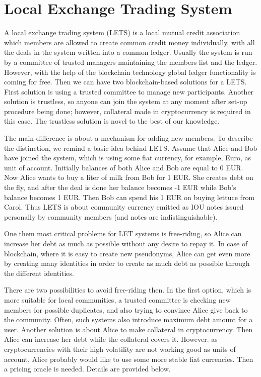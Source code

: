 \documentclass[]{llncs}   %
\begin{document}
\section{Local Exchange Trading System}
\label{sec-lets}

A local exchange trading system (LETS)\cite{williams1996local} is a local mutual credit association which members are allowed to create common credit money individually, with all the deals in the system written into a common ledger. Usually the system is run by a committee of 
trusted managers maintaining the members list and the ledger. However, with the help of the blockchain technology global ledger functionality is coming for free. Then 
we can have two blockchain-based solutions for a LETS. First solution is using a trusted committee to manage new participants. Another 
solution is trustless, so anyone can join the system at any moment after set-up procedure being done; however, collateral made in cryptocurrency is required in this case. The trustless solution is novel to the best of our knowledge.

The main difference is about a mechanism for adding new members. To describe the distinction, we remind a basic idea behind LETS. Assume that Alice and Bob have joined the system, which is using some fiat currency, for example, Euro, as unit of account. Initially
balances of both Alice and Bob are equal to 0 EUR. Now Alice wants to buy a liter of milk from Bob for 1 EUR. She creates debt on the fly, and after the deal is done her balance becomes -1 EUR while Bob's balance becomes 1 EUR. Then Bob can spend his 1 EUR on buying lettuce from Carol. Thus LETS is about community currency emitted as IOU notes issued personally by community members (and notes are indistinguishable).

One them most critical problems for LET systems is free-riding, so Alice can increase her debt as much as possible without any desire to repay it. In case of blockchain, where it is easy to create new pseudonyms, Alice can get even more by creating many identities in order to create as much debt as possible through the different identities.

There are two possibilities to avoid free-riding then. In the first option, which is more suitable for local communities, a trusted committee is checking new members for possible duplicates, and also trying to convince Alice give back to the community. Often, such systems also introduce maximum debt amount for a user. Another solution is about Alice to make collateral in cryptocurrency. Then Alice
can increase her debt while the collateral covers it. However. as cryptocurrencies with their high volatility are not working good as units of account, Alice probably would like to use some more stable fiat currencies. Then a pricing oracle is needed. Details are provided below.
\end{document}
